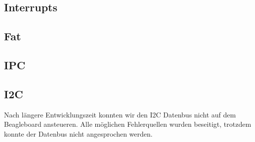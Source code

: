 \documentclass[10pt,a4paper,fleqn]{article}
\begin{document}
\subsection{Interrupts}



\subsection{Fat}

\subsection{IPC}



\subsection{I2C}
	Nach längere Entwicklungszeit konnten wir den I2C Datenbus nicht auf dem Beagleboard ansteueren.
		Alle möglichen Fehlerquellen wurden beseitigt, trotzdem konnte der Datenbus nicht angesprochen
		werden.
		
\end{document}
